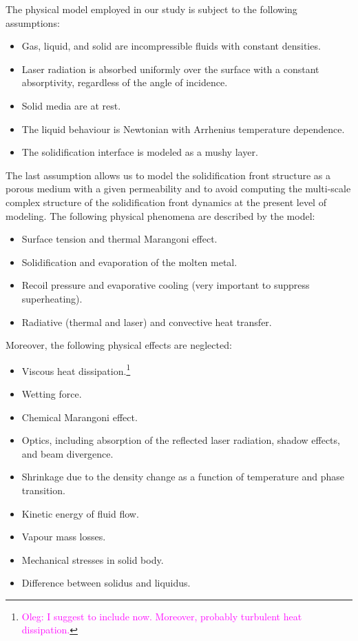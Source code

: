 \documentclass{article}
\newcommand{\oleg}[1]{\textcolor{magenta}{\footnote{\textcolor{magenta}{Oleg: #1}}}} %
\begin{document}
The physical model employed in our study is subject to the following assumptions:
\begin{itemize}
    \item Gas, liquid, and solid are incompressible fluids with constant densities.
    \item Laser radiation is absorbed uniformly over the surface with a constant absorptivity, regardless of the angle of incidence.
    \item Solid media are at rest.
    \item The liquid behaviour is Newtonian with Arrhenius temperature dependence.
    \item The solidification interface is modeled as a mushy layer.
\end{itemize}
The last assumption allows us to model the solidification front structure as a porous medium
with a given permeability and to avoid computing the multi-scale complex structure
of the solidification front dynamics at the present level of modeling.
The following physical phenomena are described by the model:
\begin{itemize}
    \item Surface tension and thermal Marangoni effect.
    \item Solidification and evaporation of the molten metal.
    \item Recoil pressure and evaporative cooling (very important to suppress superheating).
    \item Radiative (thermal and laser) and convective heat transfer.
\end{itemize}
Moreover, the following physical effects are neglected:
\begin{itemize}
    \item Viscous heat dissipation.\oleg{I suggest to include now. Moreover, probably turbulent heat dissipation.}
    \item Wetting force.
    \item Chemical Marangoni effect.
    \item Optics, including absorption of the reflected laser radiation, shadow effects, and beam divergence.
    \item Shrinkage due to the density change as a function of temperature and phase transition.
    \item Kinetic energy of fluid flow.
    \item Vapour mass losses.
    \item Mechanical stresses in solid body.
    \item Difference between solidus and liquidus.
\end{itemize}
\end{document}
